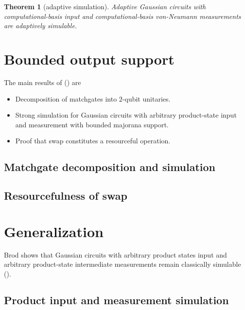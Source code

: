 \documentclass[
]{book}
\providecommand{\tightlist}{%
  \setlength{\itemsep}{0pt}\setlength{\parskip}{0pt}}
\newtheorem{theorem}{Theorem}[chapter]
\theoremstyle{definition}
\theoremstyle{definition}
\theoremstyle{definition}
\theoremstyle{definition}
\theoremstyle{remark}
\begin{document}
\begin{theorem}[adaptive simulation]
\protect\hypertarget{thm:cimoAdaptiveSimulation}{}\label{thm:cimoAdaptiveSimulation}Adaptive Gaussian circuits with computational-basis input and computational-basis
von-Neumann measurements are adaptively simulable.
\end{theorem}

\section{Bounded output support}\label{bounded-output-support}

The main results of () are

\begin{itemize}
\tightlist
\item
  Decomposition of matchgates into \(2\)-qubit unitaries.
\item
  Strong simulation for Gaussian circuits with arbitrary product-state input
  and measurement with bounded majorana support.
\item
  Proof that swap constitutes a resourceful operation.
\end{itemize}

\subsection{Matchgate decomposition and simulation}\label{matchgate-decomposition-and-simulation}

\subsection{Resourcefulness of swap}\label{resourcefulness-of-swap}

\section{Generalization}\label{generalization-1}

Brod shows that Gaussian circuits
with arbitrary product states input and arbitrary product-state
intermediate measurements remain classically simulable ().

\subsection{Product input and measurement simulation}\label{product-input-and-measurement-simulation}
\end{document}
